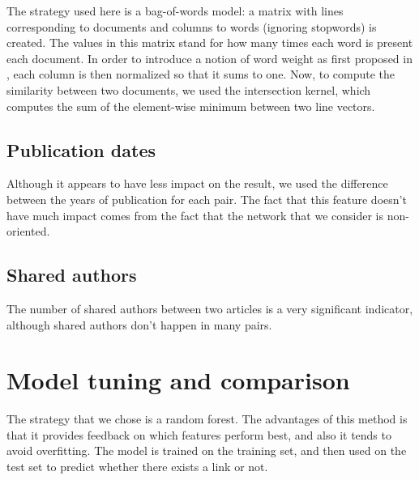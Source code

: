 \documentclass{article}
\begin{document}
The strategy used here is a bag-of-words model: a matrix with lines corresponding to documents and columns to words (ignoring stopwords) is created.
The values in this matrix stand for how many times each word is present each document.
In order to introduce a notion of word weight as first proposed in \cite{sparck1972statistical}, each column is then normalized so that it sums to one.
Now, to compute the similarity between two documents, we used the intersection kernel, which computes the sum of the element-wise minimum between two line vectors.

\subsection{Publication dates}

Although it appears to have less impact on the result, we used the difference between the years of publication for each pair.
The fact that this feature doesn't have much impact comes from the fact that the network that we consider is non-oriented.

\subsection{Shared authors}

The number of shared authors between two articles is a very significant indicator, although shared authors don't happen in many pairs.

\section{Model tuning and comparison}
\label{sec:experiments}

The strategy that we chose is a random forest. The advantages of this method is that it provides feedback on which features perform best, and also it tends to avoid overfitting. The model is trained on the training set, and then used on the test set to predict whether there exists a link or not.







\end{document}
